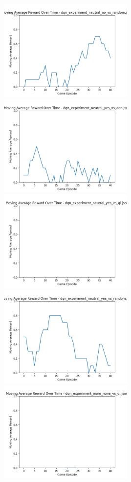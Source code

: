 \includegraphics[width=0.5\textwidth]{images/moving_average_reward_dqn_experiment_neutral_no_vs_random.png} 
\includegraphics[width=0.5\textwidth]{images/moving_average_reward_dqn_experiment_neutral_yes_vs_dqn.png} 
\includegraphics[width=0.5\textwidth]{images/moving_average_reward_dqn_experiment_neutral_yes_vs_ql.png} 
\includegraphics[width=0.5\textwidth]{images/moving_average_reward_dqn_experiment_neutral_yes_vs_random.png} 
\includegraphics[width=0.5\textwidth]{images/moving_average_reward_dqn_experiment_none_none_vs_ql.png} 

